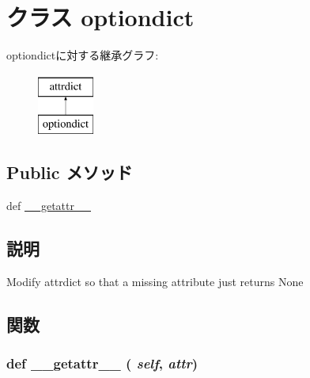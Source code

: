 \hypertarget{classm5_1_1util_1_1attrdict_1_1optiondict}{
\section{クラス optiondict}
\label{classm5_1_1util_1_1attrdict_1_1optiondict}
}
optiondictに対する継承グラフ:\begin{figure}[H]
\begin{center}
\leavevmode
\includegraphics[height=2cm]{classm5_1_1util_1_1attrdict_1_1optiondict}
\end{center}
\end{figure}
\subsection*{Public メソッド}
\begin{DoxyCompactItemize}
\item 
def \hyperlink{classm5_1_1util_1_1attrdict_1_1optiondict_a0a990b3ec3889d40889daca9ee5e4695}{\_\-\_\-getattr\_\-\_\-}
\end{DoxyCompactItemize}


\subsection{説明}
\begin{DoxyVerb}Modify attrdict so that a missing attribute just returns None\end{DoxyVerb}
 

\subsection{関数}
\hypertarget{classm5_1_1util_1_1attrdict_1_1optiondict_a0a990b3ec3889d40889daca9ee5e4695}{
\subsubsection[{\_\-\_\-getattr\_\-\_\-}]{\setlength{\rightskip}{0pt plus 5cm}def \_\-\_\-getattr\_\-\_\- ( {\em self}, \/   {\em attr})}}
\label{classm5_1_1util_1_1attrdict_1_1optiondict_a0a990b3ec3889d40889daca9ee5e4695}


